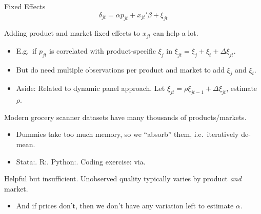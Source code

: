 \documentclass[aspectratio=169,t,11pt,table]{beamer}
\begin{document}
\begin{frame}{Fixed Effects}
    \vspace{-\baselineskip}
    \begin{equation*}
        \delta_{jt} = \alpha p_{jt} + x_{jt}'\beta + \xi_{jt}
    \end{equation*}
    \vspace{-0.5\baselineskip}
    \begin{wideitemize}
        \item Adding product and market fixed effects to $x_{jt}$ can help a lot.
        \begin{itemize}
            \item E.g.\ if $p_{jt}$ is correlated with product-specific $\xi_j$ in $\xi_{jt} = \xi_j + \xi_t + \Delta\xi_{jt}$.
            \item But do need multiple observations per product and market to add $\xi_j$ and $\xi_t$.
            \pause
            \item Aside: Related to dynamic panel approach. Let $\xi_{jt} = \rho \xi_{jt-1} + \Delta\xi_{jt}$, estimate $\rho$.
        \end{itemize}
        \pause
        \item Modern grocery scanner datasets have many thousands of products/markets.
        \begin{itemize}
            \item Dummies take too much memory, so we ``absorb'' them, i.e.\ iteratively de-mean.
            \item Stata:. R:.  Python:. Coding exercise: via.
        \end{itemize}
        \pause
        \item Helpful but insufficient. Unobserved quality typically varies by product \textit{and} market.
        \begin{itemize}
            \item And if prices don't, then we don't have any variation left to estimate $\alpha$.
        \end{itemize}
    \end{wideitemize}
\end{frame}
\end{document}

